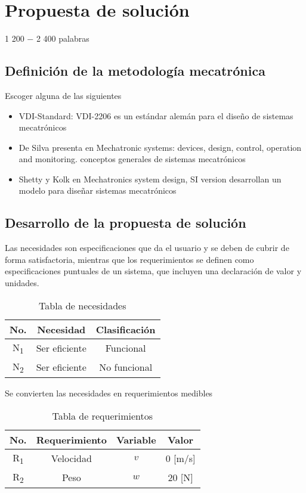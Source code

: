 \section{Propuesta de solución}
\label{Propuesta de solución}
1 200 − 2 400 palabras\\

\subsection{Definición de la metodología mecatrónica}
Escoger alguna de las siguientes
\begin{itemize}
	\item VDI-Standard: VDI-2206 es un estándar alemán para el diseño de sistemas mecatrónicos
	\item De Silva presenta en Mechatronic systems: devices, design, control, operation and monitoring. conceptos generales de sistemas mecatrónicos
	\item Shetty y Kolk en Mechatronics system design, SI version desarrollan un modelo para diseñar sistemas mecatrónicos
\end{itemize}

\subsection{Desarrollo de la propuesta de solución}
\lipsum[15]

Las necesidades son especificaciones que da el usuario y se deben de cubrir de forma satisfactoria, mientras
que los requerimientos se definen como especificaciones puntuales de un sistema, que incluyen una
declaración de valor y unidades.\\

\begin{table}[!ht]
	\centering
	\caption{Tabla de necesidades}
	\begin{tabular}{ccc}
		\toprule
		\textbf{No.} & \textbf{Necesidad} & \textbf{Clasificación} \\ \midrule
		N\textsubscript{1} &   Ser eficiente    &       Funcional        \\
		N\textsubscript{2} &   Ser eficiente    &      No funcional      \\ \bottomrule
	\end{tabular}
\end{table}

Se convierten las necesidades en requerimientos medibles
\begin{table}[!ht]
	\centering
	\caption{Tabla de requerimientos}
	\begin{tabular}{cccc}
		\toprule
		\textbf{No.} & \textbf{Requerimiento} & \textbf{Variable} & \textbf{Valor} \\ \midrule
	 R\textsubscript{1}   &       Velocidad        &       $ v $       &    0 [m/s]     \\
	 R\textsubscript{2}   &          Peso          &       $ w $       &     20 [N]     \\ \bottomrule
	\end{tabular}
\end{table}

